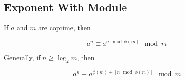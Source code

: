 \subsection{Exponent With Module}

If $a$ and $m$ are coprime, then

\[a^n \equiv a^{n \mod \phi (m)} \mod m\]

Generally, if $n \geq \log_2 m$, then

\[a^n \equiv a^{\phi (m) + [n \mod \phi (m)]} \mod m\]
